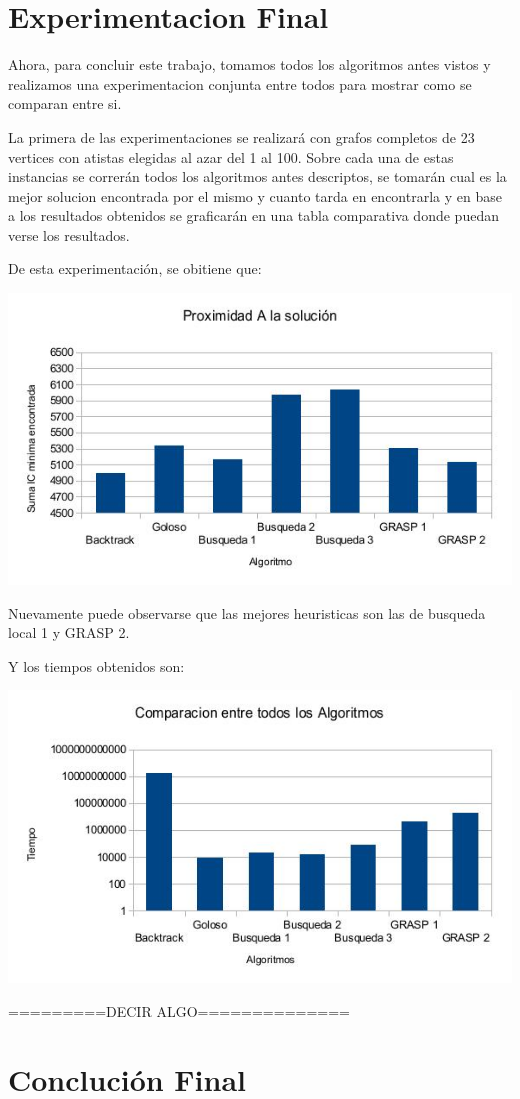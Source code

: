 \section{Experimentacion Final}
Ahora, para concluir este trabajo, tomamos todos los algoritmos antes vistos y realizamos una experimentacion conjunta entre todos para mostrar como se comparan entre si.

La primera de las experimentaciones se realizará con grafos completos de 23 vertices con atistas elegidas al azar del 1 al 100. Sobre cada una de estas instancias se correrán todos los algoritmos antes descriptos, se tomarán cual es la mejor solucion encontrada por el mismo y cuanto tarda en encontrarla y en base a los resultados obtenidos se graficarán en una tabla comparativa donde puedan verse los resultados.

De esta experimentación, se obitiene que:

\includegraphics[scale=0.5]{Con/result.jpg}

Nuevamente puede observarse que las mejores heuristicas son las de busqueda local 1 y GRASP 2.

Y los tiempos obtenidos son:

\includegraphics[scale=0.5]{Con/tiempos.jpg}

=========DECIR ALGO==============

\section{Conclución Final}
